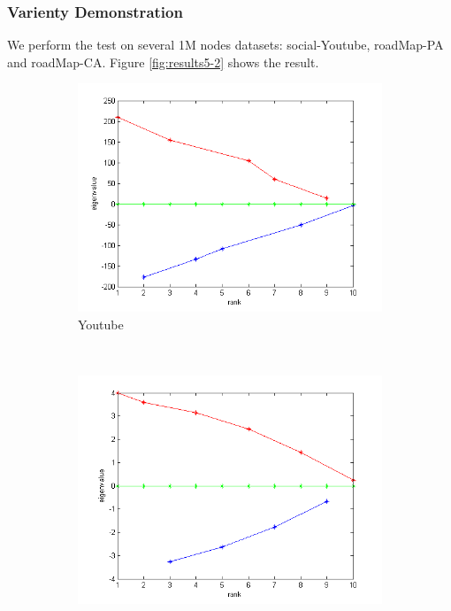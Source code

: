 \subsubsection{Varienty Demonstration}
We perform the test on several 1M nodes datasets: social-Youtube, roadMap-PA and roadMap-CA. Figure \ref{fig:results5-2} shows the result.\\
\begin{figure}
    \centering
    \begin{subfigure}[htbp]{0.6\textwidth}
            \includegraphics[width=\textwidth]{FIG/ei-youtube.png}
            \caption{Youtube}
            \label{fig:ei-youtube}
    \end{subfigure}
    ~ %
    \begin{subfigure}[htbp]{0.6\textwidth}
            \includegraphics[width=\textwidth]{FIG/ei-pa.png}

\end{subfigure}
\end{figure}
